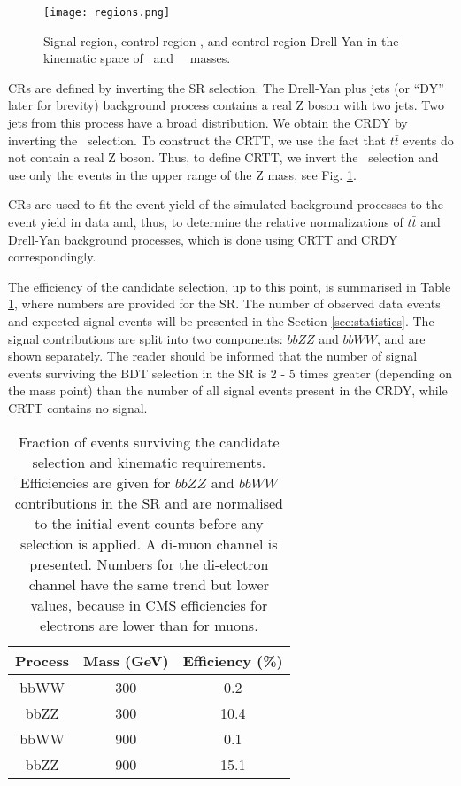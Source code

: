 \begin{figure}[!htb]%
\begin{center}
\texttt{[image: regions.png]}
\caption[Analysis phase space with the signal and two control regions.]{ Signal region, control region \ttbar, and control region Drell-Yan in the kinematic space of \ZtoLL ~and ~\HBB~masses. }
\label{fig:regions}
\end{center}
\end{figure}

CRs are defined by inverting the SR selection. The Drell-Yan plus jets (or ``DY'' later for brevity) background process contains a real Z boson with two jets. Two jets from this process have a broad distribution. We obtain the CRDY by inverting the \HBB~selection. To construct the CRTT, we use the fact that $t\bar{t}$ events do not contain a real Z boson. Thus, to define CRTT, we invert the \Zll~selection and use only the events in the upper range of the Z mass, see Fig. \ref{fig:regions}. 

CRs are used to fit the event yield of the simulated background processes to the event yield in data and, thus, to determine the relative normalizations of $t\bar{t}$ and Drell-Yan background processes, which is done using CRTT and CRDY correspondingly. 

The efficiency of the candidate selection, up to this point, is summarised in Table \ref{eff_upto_bdt}, where numbers are provided for the SR. The number of observed data events and expected signal events will be presented in the Section \ref{sec:statistics}. The signal contributions are split into two components: $bbZZ$ and $bbWW$, and are shown separately. The reader should be informed that the number of signal events surviving the BDT selection in the SR is 2 - 5 times greater (depending on the mass point) than the number of all signal events present in the CRDY, while CRTT contains no signal. 

\begin{table}
\begin{center}
\caption[Fraction of events surviving the candidate selection and kinematic requirements.]{Fraction of events surviving the candidate selection and kinematic requirements. Efficiencies are given for $bbZZ$ and $bbWW$ contributions in the SR and are normalised to the initial event counts before any selection is applied. A di-muon channel is presented. Numbers for the di-electron channel have the same trend but lower values, because in CMS efficiencies for electrons are lower than for muons.}
\begin{tabular}{ |c|c|c| } \hline
{Process} & Mass (GeV) & Efficiency (\%)  \\\hline
bbWW & 300 & 0.2 \\
bbZZ & 300 & 10.4 \\\hline
bbWW & 900 & 0.1 \\
bbZZ & 900 & 15.1 \\\hline
\end{tabular}
\label{eff_upto_bdt}
\end{center}
\end{table}

